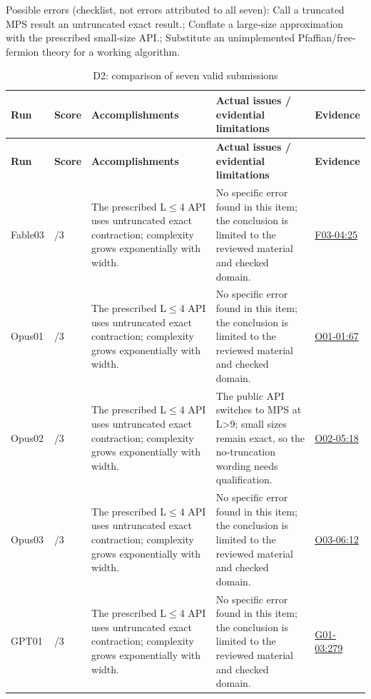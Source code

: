 \documentclass[11pt,a4paper]{article}
\begin{document}
Possible errors (checklist,\allowbreak{} not errors attributed to all seven): Call a truncated MPS result an untruncated exact result.; Conflate a large-size approximation with the prescribed small-size API.; Substitute an unimplemented Pfaffian/\allowbreak{}free-fermion theory for a working algorithm.

{\fontsize{9.0}{12.6}\selectfont
\setlength{\tabcolsep}{2.5pt}
\begin{longtable}{>{\raggedright\arraybackslash}p{}>{\raggedright\arraybackslash}p{}>{\raggedright\arraybackslash}p{}>{\raggedright\arraybackslash}p{}>{\raggedright\arraybackslash}p{}}
\caption{D2: comparison of seven valid submissions}\\
\toprule
\textbf{Run} & \textbf{Score} & \textbf{Accomplishments} & \textbf{Actual issues /\allowbreak{} evidential limitations} & \textbf{Evidence}\tabularnewline
\midrule
\endfirsthead
\toprule
\textbf{Run} & \textbf{Score} & \textbf{Accomplishments} & \textbf{Actual issues /\allowbreak{} evidential limitations} & \textbf{Evidence}\tabularnewline
\midrule
\endhead
{}Fable03 & 3/\allowbreak{}3 & The prescribed L\ensuremath{\leq}4 API uses untruncated exact contraction; complexity grows exponentially with width. & No specific error found in this item; the conclusion is limited to the reviewed material and checked domain. & \hyperref[src:F03-04]{F03-04:25}\tabularnewline
{}Opus01 & 3/\allowbreak{}3 & The prescribed L\ensuremath{\leq}4 API uses untruncated exact contraction; complexity grows exponentially with width. & No specific error found in this item; the conclusion is limited to the reviewed material and checked domain. & \hyperref[src:O01-01]{O01-01:67}\tabularnewline
{}Opus02 & 3/\allowbreak{}3 & The prescribed L\ensuremath{\leq}4 API uses untruncated exact contraction; complexity grows exponentially with width. & The public API switches to MPS at L>9; small sizes remain exact,\allowbreak{} so the no-truncation wording needs qualification. & \hyperref[src:O02-05]{O02-05:18}\tabularnewline
{}Opus03 & 3/\allowbreak{}3 & The prescribed L\ensuremath{\leq}4 API uses untruncated exact contraction; complexity grows exponentially with width. & No specific error found in this item; the conclusion is limited to the reviewed material and checked domain. & \hyperref[src:O03-06]{O03-06:12}\tabularnewline
{}GPT01 & 3/\allowbreak{}3 & The prescribed L\ensuremath{\leq}4 API uses untruncated exact contraction; complexity grows exponentially with width. & No specific error found in this item; the conclusion is limited to the reviewed material and checked domain. & \hyperref[src:G01-03]{G01-03:279}\tabularnewline

\end{longtable}}
\end{document}

